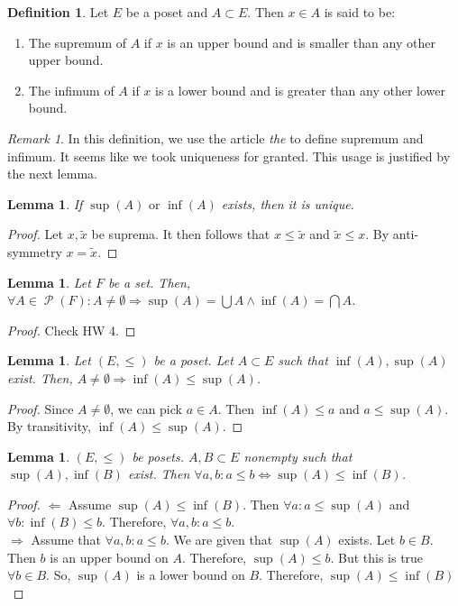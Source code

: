 \documentclass{article}
\renewcommand\O{\ensuremath{\emptyset}}
\DeclareMathOperator{\ps}{\mathcal{P}}
\newtheorem{lemma}[theorem]{Lemma}
\theoremstyle{definition}
\newtheorem{definition}{Definition}[subsection]
\theoremstyle{remark}
\newtheorem*{remark}{Remark}
\theoremstyle{plain}
\begin{document}
\begin{definition}
    Let \(E\) be a poset and \(A \subset E\). Then \(x\in A\) is said to be:
    \begin{enumerate}
        \item The supremum of \(A\) if \(x\) is an upper bound and is smaller than any other upper bound. 
        \item The infimum of \(A\) if \(x\) is a lower bound and is greater than any other lower bound.
    \end{enumerate}
\end{definition}

\begin{remark}
    In this definition, we use the article \emph{the} to define supremum and infimum. It seems like we took uniqueness for granted. 
    This usage is justified by the next lemma. 
\end{remark}

\begin{lemma}
    If \(\sup(A) \text{ or } \inf(A)\) exists, then it is unique.
\end{lemma}
\begin{proof}
    Let \(x, \tilde{x}\) be suprema. It then follows that \(x\leq \tilde{x}\) and \(\tilde{x}\leq x\).
    By anti-symmetry \(x = \tilde{x}\).
\end{proof}

\begin{lemma}
    Let \(F\) be a set. Then, \(\forall A \in \ps(F): A \neq \O \Rightarrow \sup(A) = \bigcup A \land \inf(A) = \bigcap A\).
\end{lemma}
\begin{proof}
    Check HW 4.
\end{proof}

\begin{lemma}
    Let \((E, \leq)\) be a poset. Let \(A\subset E\) such that \(\inf(A), \sup(A)\) exist. Then,
    \(A \neq \O \Rightarrow \inf(A) \leq \sup(A)\).
\end{lemma}
\begin{proof}
    Since \(A \neq \O\), we can pick \(a \in A\). Then \(\inf(A) \leq a\) and \(a\leq \sup(A)\).
    By transitivity, \(\inf(A) \leq \sup(A)\).
\end{proof}

\begin{lemma}
    \((E, \leq)\) be posets. \(A, B \subset E\) nonempty such that \(\sup(A), \inf(B)\) exist. Then \(\forall a,b: a \leq b \iff \sup(A) \leq \inf(B)\).
\end{lemma}
\begin{proof}
    \(\Leftarrow\) Assume \(\sup(A) \leq \inf(B)\). Then \(\forall a: a \leq \sup(A)\) and \(\forall b: \inf(B) \leq b\). Therefore, \(\forall a,b: a \leq b\). \\
    \(\Rightarrow\) Assume that \(\forall a,b: a \leq b\). We are given that \(\sup(A)\) exists. Let \(b \in B\). Then \(b\) is an upper bound
    on \(A\). Therefore, \(\sup(A) \leq b\). But this is true \(\forall b \in B\). So, \(\sup(A)\) is a lower bound on \(B\). Therefore, \(\sup(A) \leq \inf(B)\)
\end{proof}
\end{document}
